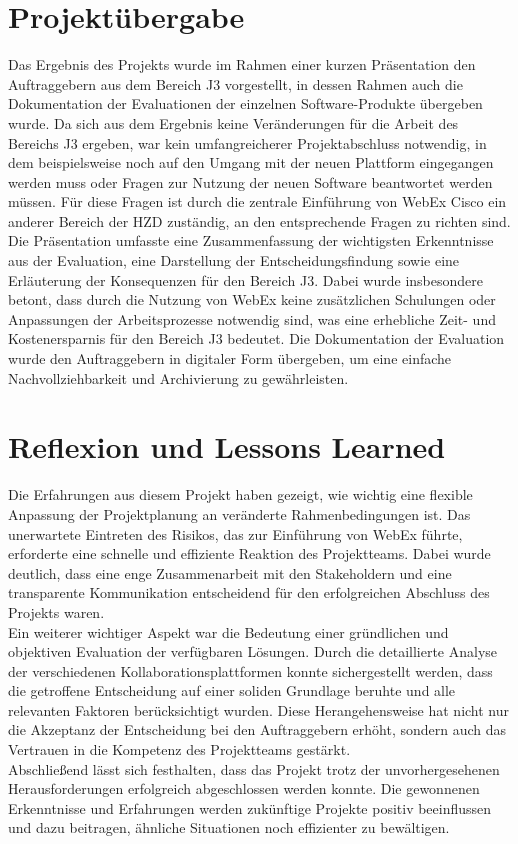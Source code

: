 \documentclass{article}
\begin{document}
	\section{Projektübergabe}
	Das Ergebnis des Projekts wurde im Rahmen einer kurzen Präsentation den Auftraggebern aus dem Bereich J3 vorgestellt, in dessen Rahmen auch die Dokumentation der Evaluationen der einzelnen Software-Produkte übergeben wurde. Da sich aus dem Ergebnis keine Veränderungen für die Arbeit des Bereichs J3 ergeben, war kein umfangreicherer Projektabschluss notwendig, in dem beispielsweise noch auf den Umgang mit der neuen Plattform eingegangen werden muss oder Fragen zur Nutzung der neuen Software beantwortet werden müssen. Für diese Fragen ist durch die zentrale Einführung von WebEx Cisco ein anderer Bereich der HZD zuständig, an den entsprechende Fragen zu richten sind. \\
	Die Präsentation umfasste eine Zusammenfassung der wichtigsten Erkenntnisse aus der Evaluation, eine Darstellung der Entscheidungsfindung sowie eine Erläuterung der Konsequenzen für den Bereich J3. Dabei wurde insbesondere betont, dass durch die Nutzung von WebEx keine zusätzlichen Schulungen oder Anpassungen der Arbeitsprozesse notwendig sind, was eine erhebliche Zeit- und Kostenersparnis für den Bereich J3 bedeutet. Die Dokumentation der Evaluation wurde den Auftraggebern in digitaler Form übergeben, um eine einfache Nachvollziehbarkeit und Archivierung zu gewährleisten. \\
	
	\section{Reflexion und Lessons Learned}
	Die Erfahrungen aus diesem Projekt haben gezeigt, wie wichtig eine flexible Anpassung der Projektplanung an veränderte Rahmenbedingungen ist. Das unerwartete Eintreten des Risikos, das zur Einführung von WebEx führte, erforderte eine schnelle und effiziente Reaktion des Projektteams. Dabei wurde deutlich, dass eine enge Zusammenarbeit mit den Stakeholdern und eine transparente Kommunikation entscheidend für den erfolgreichen Abschluss des Projekts waren. \\
	Ein weiterer wichtiger Aspekt war die Bedeutung einer gründlichen und objektiven Evaluation der verfügbaren Lösungen. Durch die detaillierte Analyse der verschiedenen Kollaborationsplattformen konnte sichergestellt werden, dass die getroffene Entscheidung auf einer soliden Grundlage beruhte und alle relevanten Faktoren berücksichtigt wurden. Diese Herangehensweise hat nicht nur die Akzeptanz der Entscheidung bei den Auftraggebern erhöht, sondern auch das Vertrauen in die Kompetenz des Projektteams gestärkt. \\
	Abschließend lässt sich festhalten, dass das Projekt trotz der unvorhergesehenen Herausforderungen erfolgreich abgeschlossen werden konnte. Die gewonnenen Erkenntnisse und Erfahrungen werden zukünftige Projekte positiv beeinflussen und dazu beitragen, ähnliche Situationen noch effizienter zu bewältigen.
\end{document}
